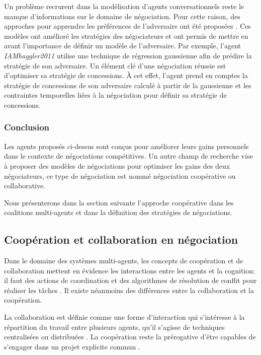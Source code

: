 		Un problème recrurent dans la modélisation d'agents conversationnels reste le manque d'informations sur le domaine de négociation. Pour cette raison, des approches pour apprendre les préférences de l'adversaire ont été proposées  \cite{williams2011using,jonker2012negotiating,frieder2013value,hindriks2008creating,hindriks2008opponent}. Ces modèles ont amélioré les stratégies des négociateurs et ont permis de mettre en avant l'importance de définir un modèle de l'adversaire. Par exemple, l'agent \textit{IAMhaggler2011} \cite{williams2011using} utilise une technique de régression gaussienne afin de prédire la stratégie de son adversaire. Un élément clé d'une négociation réussie est d'optimiser sa stratégie de concessions. À cet effet, l'agent prend en comptes la stratégie de concessions de son adversaire calculé à partir de la gaussienne et les contraintes temporelles liées à la négociation pour définir sa stratégie de concessions. 
		
		\subsubsection{Conclusion}
		
		Les agents proposés ci-dessus sont conçus pour améliorer leurs gains personnels dans le contexte de négociations compétitives. Un autre champ de recherche vise à proposer des modèles de négociations pour optimiser les gains des deux négociateurs, ce type de négociation est nommé négociation coopérative ou collaborative. 
		
		Nous présenterons dans la section suivante l'approche coopérative dans les coalitions multi-agents et dans la définition des stratégies de négociations. 
		
		
			\subsection{Coopération et collaboration en négociation}
			
			Dans le domaine des systèmes multi-agents, les concepts de coopération et de collaboration mettent en évidence les interactions entre les agents et la cognition: il faut des actions de coordination et des algorithmes de résolution de conflit pour réaliser les tâches \cite{jennings1995controlling}. Il existe néanmoins des différences entre la collaboration et la coopération.
			
			La collaboration est définie comme une forme d'interaction qui s'intéresse à la répartition du travail entre plusieurs agents, qu'il s'agisse de techniques centralisées ou distribuées \cite{ferber1997systemes}. La coopération reste la prérogative d'être capables de s'engager dans un projet explicite commun \cite{lucien2016multiagent}.
			
